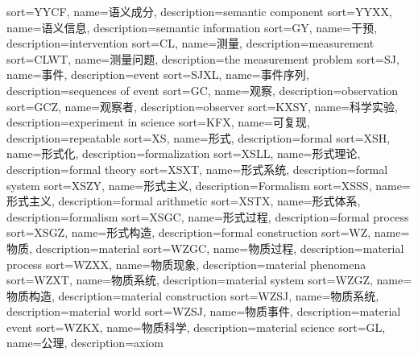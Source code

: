 {
  sort=YYCF,
  name=语义成分,
  description={semantic component}
}
{
  sort=YYXX,
  name=语义信息,
  description={semantic information}
}
{
  sort=GY,
  name=干预,
  description={intervention}
}
{
  sort=CL,
  name=测量,
  description={measurement}
}
{
  sort=CLWT,
  name=测量问题,
  description={the measurement problem}
}
{
  sort=SJ,
  name=事件,
  description={event}
}
{
  sort=SJXL,
  name=事件序列,
  description={sequences of event}
}
{
  sort=GC,
  name=观察,
  description={observation}
}
{
  sort=GCZ,
  name=观察者,
  description={observer}
}
{
  sort=KXSY,
  name=科学实验,
  description={experiment in science}
}
{
  sort=KFX,
  name=可复现,
  description={repeatable}
}
{
  sort=XS,
  name=形式,
  description={formal}
}
{
  sort=XSH,
  name=形式化,
  description={formalization}
}
{
  sort=XSLL,
  name=形式理论,
  description={formal theory}
}
{
  sort=XSXT,
  name=形式系统,
  description={formal system}
}
{
  sort=XSZY,
  name=形式主义,
  description={Formalism}
}
{
  sort=XSSS,
  name=形式主义,
  description={formal arithmetic}
}
{
  sort=XSTX,
  name=形式体系,
  description={formalism}
}
{
  sort=XSGC,
  name=形式过程,
  description={formal process}
}
{
  sort=XSGZ,
  name=形式构造,
  description={formal construction}
}
{
  sort=WZ,
  name=物质,
  description={material}
}
{
  sort=WZGC,
  name=物质过程,
  description={material process}
}
{
  sort=WZXX,
  name=物质现象,
  description={material phenomena}
}
{
  sort=WZXT,
  name=物质系统,
  description={material system}
}
{
  sort=WZGZ,
  name=物质构造,
  description={material construction}
}
{
  sort=WZSJ,
  name=物质系统,
  description={material world}
}
{
  sort=WZSJ,
  name=物质事件,
  description={material event}
}
{
  sort=WZKX,
  name=物质科学,
  description={material science}
}
{
  sort=GL,
  name=公理,
  description={axiom}
}
